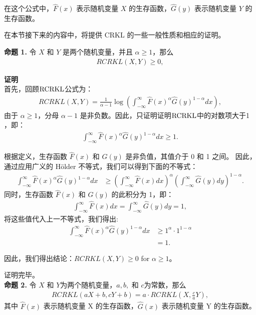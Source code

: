 在这个公式中，$\hat F(x)$ 表示随机变量 $X$ 的生存函数，$\hat G(y)$ 表示随机变量 $Y$ 的生存函数。

在本节接下来的内容中，将提供 CRKL 的一些一般性质和相应的证明。

\textbf{命题 1.} 令 $X$ 和 $Y$ 是两个随机变量，并且 $\alpha\ge 1$，那么
\begin{align*}
RCRKL(X,Y)\geq 0,
\end{align*}

\textbf{证明}\\
首先，回顾$\rm{RCRKL}$公式为：
\begin{align*}
RCRKL(X,Y)=\frac{1}{\alpha-1} \log \left( \int_{-\infty}^{\infty} \hat F(x)^{\alpha} \hat G(y)^{1-\alpha} dx \right),
\end{align*}
由于 $\alpha \geq 1$，分母 $\alpha - 1$ 是非负数。因此，只证明证明$\rm{RCRKL}$中的对数项大于1 ，即：
\begin{align*}
\int_{-\infty}^{\infty} \hat{F}(x)^{\alpha} \hat{G}(y)^{1-\alpha} dx \geq 1.
\end{align*}

根据定义\cite{111}，生存函数 $\hat{F}(x)$ 和 $\hat{G}(y)$ 是非负值，其值介于 0 和 1 之间。 因此，通过应用广义的 H\"{o}lder 不等式，我们可以得到下面的不等式：
\begin{align*}
\int_{-\infty}^{\infty} \hat{F}(x)^{\alpha} \hat{G}(y)^{1-\alpha} dx &\geq \left(\int_{-\infty}^{\infty} \hat{F}(x) dx \right)^{\alpha} \left(\int_{-\infty}^{\infty} \hat{G}(y) dy \right)^{1-\alpha}.
\end{align*}
同时，生存函数 $\hat{F}(x)$ 和 $\hat{G}(y)$ 的此积分为 1，即：
\begin{align*}
\int_{-\infty}^{\infty} \hat{F}(x) dx = \int_{-\infty}^{\infty} \hat{G}(y) dy= 1,
\end{align*}
将这些值代入上一不等式，我们得出:
\begin{align*}
\int_{-\infty}^{\infty} \hat{F}(x)^{\alpha} \hat{G}(y)^{1-\alpha} dx &\geq 1^{\alpha} \cdot 1^{1-\alpha} \\
&= 1.
\end{align*}

因此，我们得出结论：$RCRKL(X, Y) \geq 0$ for $\alpha \geq 1$。

证明完毕。\\

\textbf{命题 2.} 令 $X$ 和 $Y$为两个随机变量，$a,b,$ 和 $c$为常数，那么
\begin{align*}
RCRKL(aX+b,cY+b)=a\cdot RCRKL(X,\frac{c}{a}Y),
\end{align*}
其中 $\hat F(x)$ 表示随机变量 X 的生存函数，$\hat G(x)$ 表示随机变量 Y 的生存函数。

